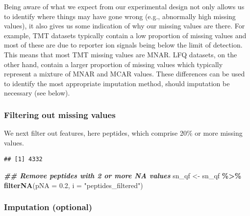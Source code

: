 \documentclass[9pt,a4paper,]{extarticle}
\newenvironment{Shaded}{\begin{snugshade}}{\end{snugshade}}
\newcommand{\AttributeTok}[1]{\textcolor[rgb]{0.13,0.29,0.53}{#1}}
\newcommand{\DocumentationTok}[1]{\textcolor[rgb]{0.56,0.35,0.01}{\textbf{\textit{#1}}}}
\newcommand{\FloatTok}[1]{\textcolor[rgb]{0.00,0.00,0.81}{#1}}
\newcommand{\FunctionTok}[1]{\textcolor[rgb]{0.13,0.29,0.53}{\textbf{#1}}}
\newcommand{\NormalTok}[1]{#1}
\newcommand{\OtherTok}[1]{\textcolor[rgb]{0.56,0.35,0.01}{#1}}
\newcommand{\SpecialCharTok}[1]{\textcolor[rgb]{0.81,0.36,0.00}{\textbf{#1}}}
\newcommand{\StringTok}[1]{\textcolor[rgb]{0.31,0.60,0.02}{#1}}
\begin{document}
Being aware of what we expect from our experimental design not only allows us to
identify where things may have gone wrong (e.g., abnormally high missing values),
it also gives us some indication of why our missing values are there. For example,
TMT datasets typically contain a low proportion of missing values and most of
these are due to reporter ion signals being below the limit of detection. This
means that most TMT missing values are MNAR. LFQ datasets, on the other hand,
contain a larger proportion of missing values which typically represent a mixture
of MNAR and MCAR values. These differences can be used to identify the most
appropriate imputation method, should imputation be necessary (see below).

\subsubsection{Filtering out missing values}\label{filtering-out-missing-values-1}

We next filter out features, here peptides, which comprise 20\% or more missing
values.

\begin{Shaded}
\end{Shaded}

\begin{verbatim}
## [1] 4332
\end{verbatim}

\begin{Shaded}
\begin{Highlighting}[]
\DocumentationTok{\#\# Remove peptides with 2 or more NA values}
\NormalTok{sn\_qf }\OtherTok{\textless{}{-}}\NormalTok{ sn\_qf }\SpecialCharTok{\%\textgreater{}\%}
  \FunctionTok{filterNA}\NormalTok{(}\AttributeTok{pNA =} \FloatTok{0.2}\NormalTok{,}
           \AttributeTok{i =} \StringTok{"peptides\_filtered"}\NormalTok{)}
\end{Highlighting}
\end{Shaded}

\subsubsection{Imputation (optional)}\label{imputation-optional-1}
\end{document}
